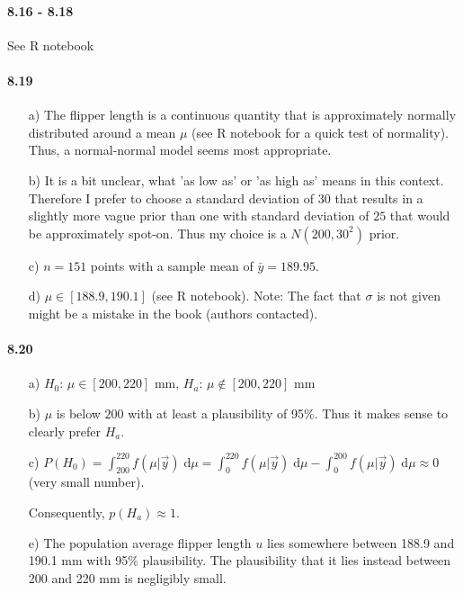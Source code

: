 \documentclass[fontsize=11pt,DIV=18,parskip=half]{scrartcl}
\begin{document}
\paragraph{8.16 - 8.18} See R notebook

\paragraph{8.19}

\begin{enumerate}
\item[a)] The flipper length is a continuous quantity that is approximately normally distributed around a mean $\mu$ (see R notebook for a quick test of normality). Thus, a normal-normal model seems most appropriate.
\item[b)] It is a bit unclear, what 'as low as' or 'as high as' means in this context. Therefore I prefer to choose a standard deviation of $30$ that results in a slightly more vague prior than one with standard deviation of $25$ that would be approximately spot-on. Thus my choice is a $N(200, 30^2)$ prior.
\item[c)] $n=151$ points with a sample mean of $\bar{y} = 189.95$.
\item[d)] $\mu \in [188.9, 190.1]$ (see R notebook). Note: The fact that $\sigma$ is not given might be a mistake in the book (authors contacted).
\end{enumerate}

\paragraph{8.20}

\begin{enumerate}
\item[a)] $H_0$: $\mu \in [200,220]$ mm, $H_a$: $\mu \notin [200,220]$ mm
\item[b)] $\mu$ is below $200$ with at least a plausibility of 95\%. Thus it makes sense to clearly prefer $H_a$.
\item[c)] $P(H_0) = \int_{200}^{220} f(\mu|\vec{y}) \; \text{d}\mu = \int_{0}^{220} f(\mu|\vec{y}) \; \text{d}\mu - \int_{0}^{200} f(\mu|\vec{y}) \; \text{d}\mu \approx 0$ (very small number).

Consequently, $p(H_a) \approx 1$.

\item[e)] The population average flipper length $u$ lies somewhere between 188.9 and 190.1 mm with 95\% plausibility. The plausibility that it lies instead between 200 and 220 mm is negligibly small.
\end{enumerate}
\end{document}

